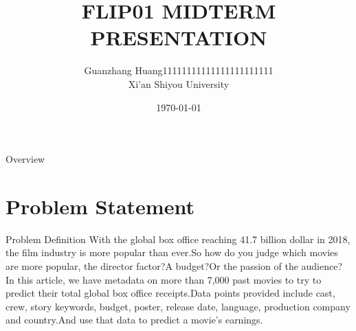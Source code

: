 \documentclass[
 size=12pt,
 paper=smartboard, %
 mode=present, %
 display=slides, %
style=tuliplab,
pauseslide,
fleqn,leqno]{powerdot}
\title{FLIP01 MIDTERM PRESENTATION}
\author{
Guanzhang Huang11111111111111111111111
\\
Xi'an Shiyou University 
}
\date{\today}
\begin{document}
\maketitle 
\begin{slide}[toc=,bm=]{Overview}
  \tableofcontents[content=sections]
\end{slide}

  \section{Problem Statement}

  \begin{slide}{Problem Definition}
 \hspace{0.5cm}  
 With the global box office reaching 41.7 billion dollar in 2018, the film industry is more popular than ever.So how do you judge which movies are more popular, the director factor?A budget?Or the passion of the audience?
 In this article, we have metadata on more than 7,000 past movies to try to predict their total global box office receipts.Data points provided include cast, crew, story keywords, budget, poster, release date, language, production company and country.And use that data to predict a movie's earnings.
  \end{slide}
\end{document}
